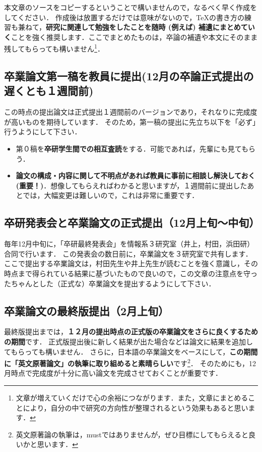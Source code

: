 \documentclass[dvipdfmx,autodetect-engine]{jsreport}
\begin{document}
本文章のソースをコピーするということで構いませんので，なるべく早く作成をしてください．
作成後は放置するだけでは意味がないので，\TeX の書き方の練習も兼ねて，\textbf{研究に関連して勉強をしたことを随時 (例えば) 補遺にまとめていく}ことを強く推奨します．ここでまとめたものは，卒論の補遺や本文にそのまま残してもらっても構いません\footnote{文章が増えていくだけで心の余裕につながります．また，文章にまとめることにより，自分の中で研究の方向性が整理されるという効果もあると思います．}．

\subsection{卒業論文第一稿を教員に提出(12月の卒論正式提出の遅くとも１週間前)}

この時点の提出論文は正式提出１週間前のバージョンであり，それなりに完成度が高いものを期待しています．
そのため，第一稿の提出に先立ち以下を「必ず」行うようにして下さい．
\begin{itemize}
\item 第０稿を\textbf{卒研学生間での相互査読}をする．可能であれば，先輩にも見てもらう．
\item \textbf{論文の構成・内容に関して不明点があれば教員に事前に相談し解決しておく(重要！)}．想像してもらえればわかると思いますが，１週間前に提出したあとでは，大幅変更は難しいので，これは非常に重要です．
\end{itemize}

\subsection{卒研発表会と卒業論文の正式提出（12月上旬〜中旬）}

毎年12月中旬に，「卒研最終発表会」を情報系３研究室（井上，村田，浜田研）合同で行います．
この発表会の数日前に，卒業論文を３研究室で共有します．ここで提出する卒業論文は，村田先生や井上先生が読むことを強く意識し，その時点まで得られている結果に基づいたもので良いので，この文章の注意点を守ったちゃんとした（正式な）卒業論文を提出するようにして下さい．

\subsection{卒業論文の最終版提出（2月上旬）}

最終版提出までは，\textbf{１２月の提出時点の正式版の卒業論文をさらに良くするための期間}です．
正式版提出後に新しく結果が出た場合などは論文に結果を追加してもらっても構いません．
さらに，日本語の卒業論文をベースにして，\textbf{この期間に「英文原著論文」の執筆に取り組めると素晴らしい}です\footnote{英文原著論の執筆は，mustではありませんが，ぜひ目標にしてもらえると良いかと思います．}．
そのためにも，12月時点で完成度が十分に高い論文を完成させておくことが重要です．
\end{document}
